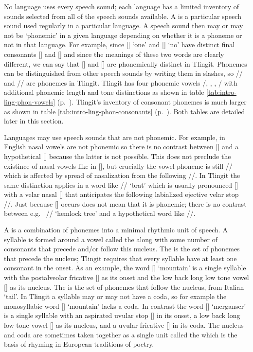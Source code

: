 No language uses every speech sound; each language has a limited inventory of sounds selected from all of the speech sounds available. A  is a particular speech sound used regularly in a particular language. A speech sound then may or may not be ‘phonemic’ in a given language depending on whether it is a phoneme or not in that language. For example, since  [] ‘one’ and  [] ‘no’ have distinct final consonants [] and [] and since the meanings of these two words are clearly different, we can say that [] and [] are phonemically distinct in Tlingit. Phonemes can be distinguished from other speech sounds by writing them in slashes, so // and // are phonemes in Tlingit. Tlingit has four phonemic vowels /, , , / with additional phonemic length and tone distinctions as shown in table \ref{tab:intro-ling-phon-vowels} (p.\ \pageref{tab:intro-ling-phon-vowels}). Tlingit’s inventory of consonant phonemes is much larger as shown in table \ref{tab:intro-ling-phon-consonants} (p.\ \pageref{tab:intro-ling-phon-consonants}). Both tables are detailed later in this section.

Languages may use speech sounds that are not phonemic. For example, in English nasal vowels are not phonemic so there is no contrast between  [] and a hypothetical  [] because the latter is not possible. This does not preclude the existince of nasal vowels like in  [], but crucially the vowel phoneme is still // which is affected by spread of nasalization from the following //. In Tlingit the same distinction applies in a word like  // ‘brat’ which is usually pronounced [] with a velar nasal [] that anticipates the following labialized ejective velar stop //. Just because [] occurs does not mean that it is phonemic; there is no contrast between e.g.\  // ‘hemlock tree’ and a hypothetical word like  //.

A  is a combination of phonemes into a minimal rhythmic unit of speech. A syllable is formed around a vowel called the  along with some number of consonants that precede and/or follow this nucleus. The  is the set of phonemes that precede the nucleus; Tlingit requires that every syllable have at least one consonant in the onset. As an example, the word  [] ‘mountain’ is a single syllable with the postalveolar fricative [] as its onset and the low back long low tone vowel [] as its nucleus. The  is the set of phonemes that follow the nucleus, from Italian  ‘tail’. In Tlingit a syllable may or may not have a coda, so for example the monosyllabic word  [] ‘mountain’ lacks a coda. In contrast the word  [] ‘merganser’ is a single syllable with an aspirated uvular stop [] in its onset, a low back long low tone vowel [] as its nucleus, and a uvular fricative [] in its coda. The nucleus and coda are sometimes taken together as a single unit called the  which is the basis of rhyming in European traditions of poetry.

